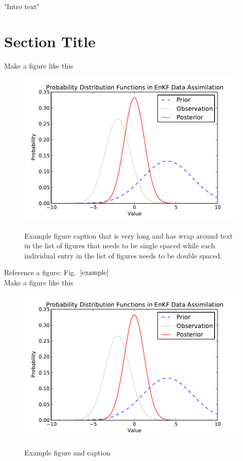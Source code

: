 \documentclass{ttuthes2015}
\newcommand{\addLOFspace}[1][2ex]{\addtocontents{lof}{\protect\addvspace{#1}}}
\newcommand{\addTOCspace}[1][2ex]{\addtocontents{toc}{\protect\addvspace{#1}}}
\newcommand{\tab}{\hspace*{2em}}  %
\begin{document}

"Intro text"

\section{Section Title}  %
\addTOCspace

\tab Make a figure like this
\begin{figure}[!htb]
  \centering
  \noindent\includegraphics[width=30pc,angle=0]{./example.pdf}\\
     \caption{Example figure caption that is very long and has wrap around text in the list of figures that needs to be single spaced while each individual entry in the list of figures needs to be double spaced.}
\label{example}
\addLOFspace
\end{figure}

\tab Reference a figure: Fig.~$\ref{example}$ \\

\tab Make a figure like this
\begin{figure}[!htb]
  \centering
  \noindent\includegraphics[width=30pc,angle=0]{./example.pdf}\\
  \caption{Example figure and caption}
\label{example2}
\end{figure}
\end{document}
